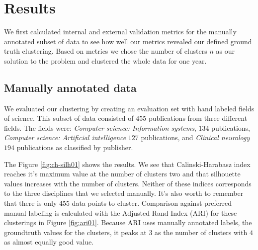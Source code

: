 \chapter{Results}
\label{chapter:results}

We first calculated internal and external validation metrics for 
the manually annotated subset of data to see how well our metrics 
revealed our defined ground truth clustering. Based on metrics we 
chose the number of clusters $n$ as our solution to the problem
and clustered the whole data for one year.

\section{Manually annotated data}
We evaluated our clustering by creating an evaluation set with
hand labeled fields of science. This subset of data consisted of 
$455$ publications from three different fields. The fields were:
\emph{Computer science: Information systems}, $134$ publications,
\emph{Computer science: Artificial intelligence} $127$ publications, 
and \emph{Clinical neurology} $194$ publications as classified by 
publisher. 

The Figure \ref{fig:ch-silh01} shows the results. We see that
Calinski-Harabasz index reaches it's maximum value at the number
of clusters two and that silhouette values increases with the
number of clusters.
Neither of these indices corresponds to the three disciplines
that we selected manually. It's also worth to remember that there
is only 455 data points to cluster. Comparison against preferred
manual labeling is calculated with the 
Adjusted Rand Index (ARI) for these clusterings in Figure 
\ref{fig:ari01}. Because ARI uses manually annotated labels, the 
groundtruth values for the clusters, it peaks at $3$ as the number 
of clusters with $4$ as almost equally good value.


